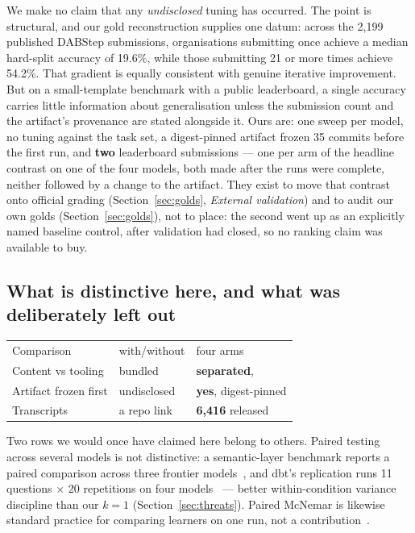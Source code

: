 We make no claim that any \emph{undisclosed} tuning has occurred. The point is
structural, and our gold reconstruction
supplies one datum: across the 2{,}199 published DABStep submissions,
organisations submitting once achieve a median hard-split accuracy of 19.6\%,
while those submitting 21 or more times achieve 54.2\%. That gradient is equally
consistent with genuine iterative improvement. But on a small-template benchmark
with a public leaderboard, a single accuracy carries little information about
generalisation unless the submission count and the artifact's provenance are
stated alongside it. Ours are: one sweep per model, no tuning against the task
set, a digest-pinned artifact frozen 35 commits before the first run, and
\textbf{two} leaderboard submissions --- one per arm of the headline contrast
on one of the four models,
both made after the runs were complete, neither followed by a change to the
artifact. They exist to move that contrast onto official grading
(Section~\ref{sec:golds}, \emph{External validation}) and to audit our own golds
(Section~\ref{sec:golds}), not to place: the second went up as an explicitly
named baseline control, after validation had closed, so no ranking claim was
available to buy.

\subsection{What is distinctive here, and what was deliberately left out}

\begin{center}
\footnotesize
\setlength{\tabcolsep}{3pt}
\begin{tabular}{@{}L{0.365\columnwidth}L{0.20\columnwidth}L{0.36\columnwidth}@{}}
\toprule
 &  &  \\
\midrule
Comparison             & with/without & four arms \\
Content vs tooling & bundled & \textbf{separated}, \armH{} \\
Artifact frozen first  & undisclosed  & \textbf{yes}, digest-pinned \\
Transcripts            & a repo link  & \textbf{6{,}416} released \\
\bottomrule
\end{tabular}
\end{center}

Two rows we would once have claimed here belong to others. Paired testing
across several models is not distinctive: a semantic-layer benchmark reports a
paired comparison across three frontier models~\cite{semantic-paired}, and
dbt's replication runs 11 questions $\times$ 20 repetitions on four
models~\cite{dbt-benchmark} --- better within-condition variance discipline
than our $k{=}1$ (Section~\ref{sec:threats}). Paired McNemar is likewise
standard practice for comparing learners on one run, not a
contribution~\cite{dietterich}.


